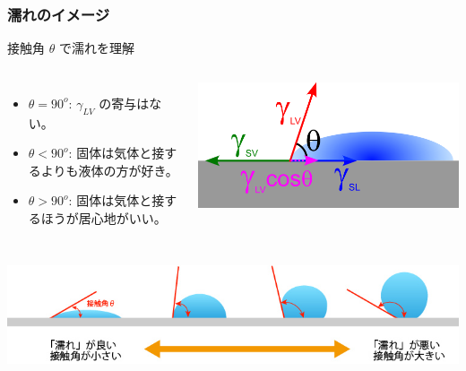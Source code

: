 \documentclass[12pt, dvipdfmx]{beamer}
\begin{document}
\begin{frame}
	\frametitle{濡れのイメージ}
	
		\begin{block}{接触角 $\theta$ で濡れを理解}
			\begin{columns}[c, onlytextwidth]
					\begin{itemize}
						\item $\theta = 90^{o}$: $\gamma_{LV}$ の寄与はない。
						\item $\theta < 90^{o}$: 固体は気体と接するよりも液体の方が好き。
						\item $\theta > 90^{o}$: 固体は気体と接するほうが居心地がいい。
					\end{itemize}
				\centering
				\includegraphics[width=\textwidth]{young.png}
			\end{columns}
		\end{block}
	\vspace{5mm}
	\centering
			\includegraphics[width=\textwidth]{wetting.png}
\end{frame}
\end{document}
